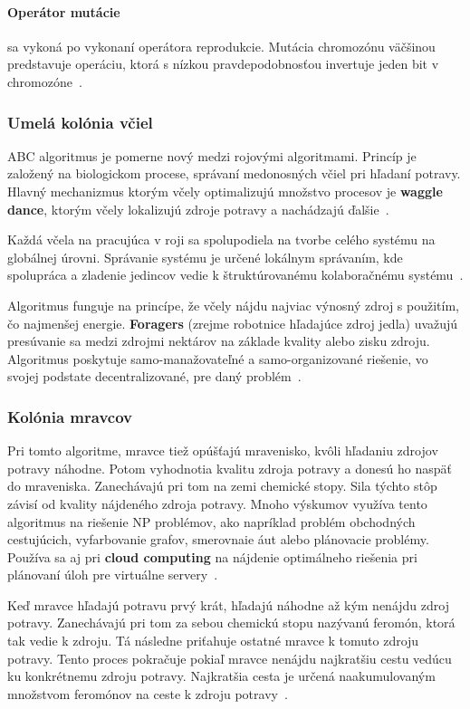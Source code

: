 \documentclass[a4paper,slovak,12pt,appendix]{article}
\begin{document}
\paragraph{Operátor mutácie} sa vykoná po vykonaní operátora reprodukcie.
Mutácia chromozónu väčšinou predstavuje operáciu, ktorá s nízkou
pravdepodobnosťou invertuje jeden bit v chromozóne~\cite{Chavan2015}.

\subsubsection{Umelá kolónia včiel}
ABC algoritmus je pomerne nový medzi rojovými algoritmami. Princíp je založený
na biologickom procese, správaní medonosných včiel pri hľadaní potravy. Hlavný
mechanizmus ktorým včely optimalizujú množstvo procesov je \textbf{waggle dance},
ktorým včely lokalizujú zdroje potravy a nachádzajú ďalšie~\cite{Chavan2015}.

Každá včela na pracujúca v roji sa spolupodiela na tvorbe celého systému na
globálnej úrovni. Správanie systému je určené lokálnym správaním, kde spolupráca
a zladenie jedincov vedie k štruktúrovanému kolaboračnému systému~\cite{Chavan2015}.

Algoritmus funguje na princípe, že včely nájdu najviac výnosný zdroj
s použitím, čo najmenšej energie. \textbf{Foragers} (zrejme robotnice hľadajúce zdroj jedla) uvažujú
presúvanie sa medzi zdrojmi nektárov na základe kvality alebo zisku zdroju.
Algoritmus poskytuje samo-manažovateľné a samo-organizované riešenie, vo svojej
podstate decentralizované, pre daný problém~\cite{Buhussain2016}.

\subsubsection{Kolónia mravcov}
Pri tomto algoritme, mravce tiež opúšťajú mravenisko, kvôli hľadaniu zdrojov
potravy náhodne. Potom vyhodnotia kvalitu zdroja potravy a donesú ho naspäť do
mraveniska. Zanechávajú pri tom na zemi chemické stopy. Sila týchto stôp závisí
od kvality nájdeného zdroja potravy. Mnoho výskumov využíva tento algoritmus na
riešenie NP problémov, ako napríklad problém obchodných cestujúcich,
vyfarbovanie grafov, smerovnaie áut alebo plánovacie problémy. Používa sa aj pri
\textbf{cloud computing} na nájdenie optimálneho riešenia pri plánovaní úloh
pre virtuálne servery~\cite{Buhussain2016}.

Keď mravce hľadajú potravu prvý krát, hľadajú náhodne až kým nenájdu zdroj
potravy. Zanechávajú pri tom za sebou chemickú stopu nazývanú feromón, ktorá
tak vedie k zdroju. Tá následne priťahuje ostatné mravce k tomuto zdroju
potravy. Tento proces pokračuje pokiaľ mravce nenájdu najkratšiu cestu vedúcu
ku konkrétnemu zdroju potravy. Najkratšia cesta je určená naakumulovaným
množstvom feromónov na ceste k zdroju potravy~\cite{Buhussain2016}.
\end{document}
